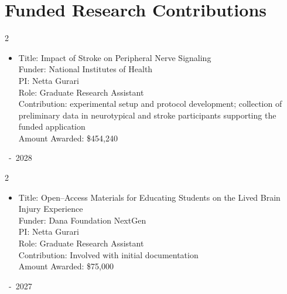 \documentclass[10pt, letterpaper]{article}
\newenvironment{highlights}{
    \begin{itemize}[
        topsep=0.10 cm,
        parsep=0.10 cm,
        partopsep=0pt,
        itemsep=0pt,
        leftmargin=0.2 cm + 10pt
    ]
}{
    \end{itemize}
} %
\newenvironment{twocolentry}[2][]{
    \onecolentry
    \def\secondColumn{#2}
    \setcolumnwidth{\fill, 2.8 cm}
    \begin{paracol}{2}
}{
    \switchcolumn \raggedleft \secondColumn
    \end{paracol}
    \endonecolentry
} %
\begin{document}
\vspace{-.6em}
\section{Funded Research Contributions}
\vspace{-.4em}



\begin{twocolentry}{
        2026~-~2028
        }
\begin{highlights}

\item Title: Impact of Stroke on Peripheral Nerve Signaling\\
Funder: National Institutes of Health\\
PI: Netta Gurari\\
Role: Graduate Research Assistant\\
Contribution: experimental setup and protocol development; collection of preliminary data in neurotypical and stroke participants supporting the funded application \\
Amount Awarded: \$454,240 \\
\end{highlights}
\end{twocolentry}
\vspace{-.8em}

\begin{twocolentry}{
        2026~-~2027
        }
\begin{highlights}

\item Title: Open--Access Materials for Educating Students on the Lived Brain Injury Experience\\
Funder: Dana Foundation NextGen\\
PI: Netta Gurari\\
Role: Graduate Research Assistant\\
Contribution: Involved with initial documentation\\
Amount Awarded: \$75,000 \\
\end{highlights}
\end{twocolentry}
\vspace{-.8em}
\end{document}
